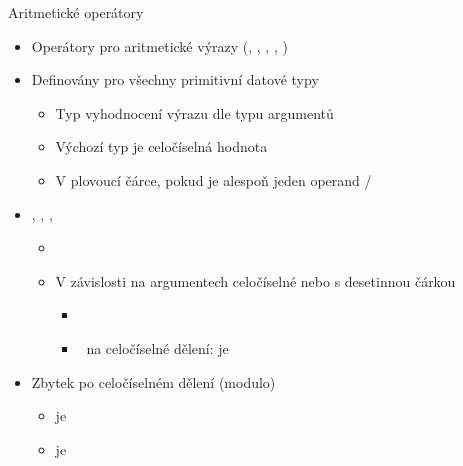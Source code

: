 \begin{frame}{Aritmetické operátory}

  \begin{itemize}
    \item Operátory pro aritmetické výrazy (\code{+}, \code{\-}, \code{*},
      \code{/}, \code{\%})

    \pause

    \item Definovány pro všechny primitivní datové typy
    \begin{itemize}
      \item Typ vyhodnocení výrazu dle typu argumentů
      \item Výchozí typ je celočíselná hodnota
      \item V plovoucí čárce, pokud je alespoň jeden operand
        /
    \end{itemize}

    \pause

    \item \code{+}, \code{\-}, \code{*}, \code{/}
    \begin{itemize}
      \item {}

      \pause

      \item V závislosti na argumentech celočíselné nebo s desetinnou čárkou
      \begin{itemize}
	\item {}
	\item \pozor\ na celočíselné dělení:  je 
      \end{itemize}

    \end{itemize}

    \pause

    \item Zbytek po celočíselném dělení \code{\%} (modulo)
    \begin{itemize}
      \item {} je 
      \item {} je 
    \end{itemize}

  \end{itemize}

\end{frame}

